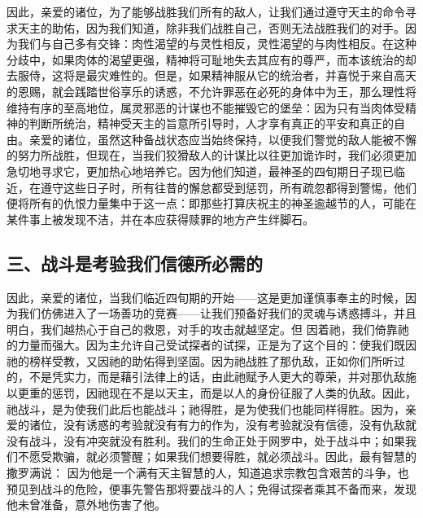 因此，亲爱的诸位，为了能够战胜我们所有的敌人，让我们通过遵守天主的命令寻求天主的助佑，因为我们知道，除非我们战胜自己，否则无法战胜我们的对手。因为我们与自己多有交锋：肉性渴望的与灵性相反，灵性渴望的与肉性相反。在这种分歧中，如果肉体的渴望更强，精神将可耻地失去其应有的尊严，而本该统治的却去服侍，这将是最灾难性的。但是，如果精神服从它的统治者，并喜悦于来自高天的恩赐，就会践踏世俗享乐的诱惑，不允许罪恶在必死的身体中为王，那么理性将维持有序的至高地位，属灵邪恶的计谋也不能摧毁它的堡垒：因为只有当肉体受精神的判断所统治，精神受天主的旨意所引导时，人才享有真正的平安和真正的自由。亲爱的诸位，虽然这种备战状态应当始终保持，以便我们警觉的敌人能被不懈的努力所战胜，但现在，当我们狡猾敌人的计谋比以往更加诡诈时，我们必须更加急切地寻求它，更加热心地培养它。因为他们知道，最神圣的四旬期日子现已临近，在遵守这些日子时，所有往昔的懈怠都受到惩罚，所有疏忽都得到警惕，他们便将所有的仇恨力量集中于这一点：即那些打算庆祝主的神圣逾越节的人，可能在某件事上被发现不洁，并在本应获得赎罪的地方产生绊脚石。\par


\subsection{三、战斗是考验我们信德所必需的}

因此，亲爱的诸位，当我们临近四旬期的开始——这是更加谨慎事奉主的时候，因为我们仿佛进入了一场善功的竞赛——让我们预备好我们的灵魂与诱惑搏斗，并且明白，我们越热心于自己的救恩，对手的攻击就越坚定。但 因着祂，我们倚靠祂的力量而强大。因为主允许自己受试探者的试探，正是为了这个目的：使我们既因祂的榜样受教，又因祂的助佑得到坚固。因为祂战胜了那仇敌，正如你们所听过的，不是凭实力，而是藉引法律上的话，由此祂赋予人更大的尊荣，并对那仇敌施以更重的惩罚，因祂现在不是以天主，而是以人的身份征服了人类的仇敌。因此，祂战斗，是为使我们此后也能战斗；祂得胜，是为使我们也能同样得胜。因为，亲爱的诸位，没有诱惑的考验就没有有力的作为，没有考验就没有信德，没有仇敌就没有战斗，没有冲突就没有胜利。我们的生命正处于网罗中，处于战斗中；如果我们不愿受欺骗，就必须警醒；如果我们想要得胜，就必须战斗。因此，最有智慧的撒罗满说： 因为他是一个满有天主智慧的人，知道追求宗教包含艰苦的斗争，也预见到战斗的危险，便事先警告那将要战斗的人；免得试探者乘其不备而来，发现他未曾准备，意外地伤害了他。\par

